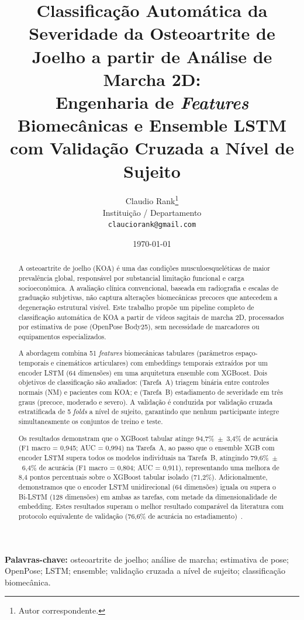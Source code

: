 \documentclass[a4paper,12pt]{article}
\title{%
  \textbf{Classificação Automática da Severidade da Osteoartrite de Joelho
  a partir de Análise de Marcha 2D:}\\[4pt]
  \large Engenharia de \textit{Features} Biomecânicas e Ensemble LSTM com
  Validação Cruzada a Nível de Sujeito
}
\author{%
  Claudio Rank\thanks{Autor correspondente.}\\[2pt]
  \small Instituição / Departamento\\
  \small \texttt{clauciorank@gmail.com}
}
\date{\today}
\begin{document}
\maketitle
\thispagestyle{empty}

\begin{abstract}
A osteoartrite de joelho (KOA) é uma das condições musculoesqueléticas
de maior prevalência global, responsável por substancial limitação funcional
e carga socioeconômica. A avaliação clínica convencional, baseada em radiografia
e escalas de graduação subjetivas, não captura alterações biomecânicas precoces
que antecedem a degeneração estrutural visível. Este trabalho propõe um pipeline
completo de classificação automática de KOA a partir de vídeos sagitais de marcha
2D, processados por estimativa de pose (OpenPose Body25), sem necessidade de
marcadores ou equipamentos especializados.

A abordagem combina 51 \textit{features} biomecânicas tabulares (parâmetros
espaço-temporais e cinemáticos articulares) com embeddings temporais extraídos
por um encoder LSTM (64 dimensões) em uma arquitetura ensemble com XGBoost.
Dois objetivos de classificação são avaliados: (Tarefa~A) triagem binária entre
controles normais (NM) e pacientes com KOA; e (Tarefa~B) estadiamento de
severidade em três graus (precoce, moderado e severo). A validação é conduzida
por validação cruzada estratificada de 5 \textit{folds} a nível de sujeito,
garantindo que nenhum participante integre simultaneamente os conjuntos de treino
e teste.

Os resultados demonstram que o XGBoost tabular atinge 94,7\%~$\pm$~3,4\% de
acurácia (F1 macro = 0,945; AUC = 0,994) na Tarefa~A, ao passo que o ensemble
XGB com encoder LSTM supera todos os modelos individuais na Tarefa~B, atingindo
79,6\%~$\pm$~6,4\% de acurácia (F1 macro = 0,804; AUC = 0,911), representando
uma melhora de 8,4 pontos percentuais sobre o XGBoost tabular isolado (71,2\%).
Adicionalmente, demonstramos que o encoder LSTM unidirecional (64 dimensões) iguala
ou supera o Bi-LSTM (128 dimensões) em ambas as tarefas, com metade da
dimensionalidade de embedding. Estes resultados superam o melhor resultado
comparável da literatura com protocolo equivalente de validação
(76,6\% de acurácia no estadiamento)~\cite{Kaya2025}.
\end{abstract}

\vspace{6pt}
\noindent\textbf{Palavras-chave:} osteoartrite de joelho; análise de marcha;
estimativa de pose; OpenPose; LSTM; ensemble; validação cruzada a nível de sujeito;
classificação biomecânica.
\end{document}
